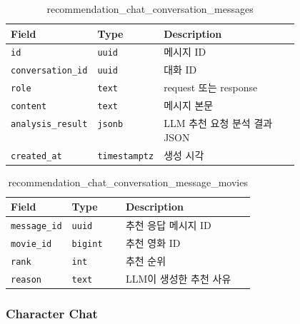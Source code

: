 \documentclass[11pt,a4paper]{article}
\renewcommand{\arraystretch}{1.18}
\begin{document}
\begin{table}[H]
\centering
\footnotesize
\setlength{\tabcolsep}{5pt}
\renewcommand{\arraystretch}{1.28}
\begin{tabularx}{\linewidth}{@{}>{\RaggedRight\arraybackslash}p{0.25\linewidth}>{\RaggedRight\arraybackslash}p{0.22\linewidth}>{\RaggedRight\arraybackslash}X@{}}
\toprule
\textbf{Field} & \textbf{Type} & \textbf{Description} \\
\midrule
\texttt{id} & \texttt{uuid} & 메시지 ID \\
\texttt{conversation\_\allowbreak{}id} & \texttt{uuid} & 대화 ID \\
\texttt{role} & \texttt{text} & request 또는 response \\
\texttt{content} & \texttt{text} & 메시지 본문 \\
\texttt{analysis\_\allowbreak{}result} & \texttt{jsonb} & LLM 추천 요청 분석 결과 JSON \\
\texttt{created\_\allowbreak{}at} & \texttt{timestamptz} & 생성 시각 \\
\bottomrule
\end{tabularx}
\caption{recommendation\_chat\_conversation\_messages}
\end{table}

\begin{table}[H]
\centering
\footnotesize
\setlength{\tabcolsep}{5pt}
\renewcommand{\arraystretch}{1.28}
\begin{tabularx}{\linewidth}{@{}>{\RaggedRight\arraybackslash}p{0.25\linewidth}>{\RaggedRight\arraybackslash}p{0.22\linewidth}>{\RaggedRight\arraybackslash}X@{}}
\toprule
\textbf{Field} & \textbf{Type} & \textbf{Description} \\
\midrule
\texttt{message\_\allowbreak{}id} & \texttt{uuid} & 추천 응답 메시지 ID \\
\texttt{movie\_\allowbreak{}id} & \texttt{bigint} & 추천 영화 ID \\
\texttt{rank} & \texttt{int} & 추천 순위 \\
\texttt{reason} & \texttt{text} & LLM이 생성한 추천 사유 \\
\bottomrule
\end{tabularx}
\caption{recommendation\_chat\_conversation\_message\_movies}
\end{table}

\hypertarget{character-chat-1}{%
\subsubsection{Character Chat}\label{character-chat-1}}
\end{document}
